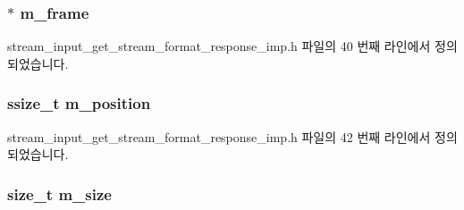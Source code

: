 \subsubsection[{\texorpdfstring{m\+\_\+frame}{m_frame}}]{$\ast$ m\+\_\+frame\hspace{0.3cm}{\ttfamily [private]}}\hypertarget{classavdecc__lib_1_1stream__input__get__stream__format__response__imp_a50417969cf438e7c8d698726bbbe2ff9}{}\label{classavdecc__lib_1_1stream__input__get__stream__format__response__imp_a50417969cf438e7c8d698726bbbe2ff9}


stream\+\_\+input\+\_\+get\+\_\+stream\+\_\+format\+\_\+response\+\_\+imp.\+h 파일의 40 번째 라인에서 정의되었습니다.

\subsubsection[{\texorpdfstring{m\+\_\+position}{m_position}}]{\setlength{\rightskip}{0pt plus 5cm}ssize\+\_\+t m\+\_\+position\hspace{0.3cm}{\ttfamily [private]}}\hypertarget{classavdecc__lib_1_1stream__input__get__stream__format__response__imp_af5e691c4a8a0feb07f48440b321206cd}{}\label{classavdecc__lib_1_1stream__input__get__stream__format__response__imp_af5e691c4a8a0feb07f48440b321206cd}


stream\+\_\+input\+\_\+get\+\_\+stream\+\_\+format\+\_\+response\+\_\+imp.\+h 파일의 42 번째 라인에서 정의되었습니다.

\subsubsection[{\texorpdfstring{m\+\_\+size}{m_size}}]{\setlength{\rightskip}{0pt plus 5cm}size\+\_\+t m\+\_\+size\hspace{0.3cm}{\ttfamily [private]}}\hypertarget{classavdecc__lib_1_1stream__input__get__stream__format__response__imp_a0dc3c363255f193681c77b4d2a82e995}{}\label{classavdecc__lib_1_1stream__input__get__stream__format__response__imp_a0dc3c363255f193681c77b4d2a82e995}


